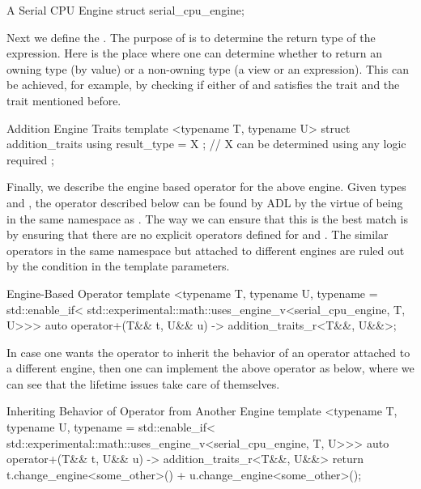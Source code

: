 \documentclass[oneside,11pt,a4paper]{jbarticle}
\begin{document}
\begin{codecpp}{A Serial CPU Engine}
  struct serial_cpu_engine{};
\end{codecpp}

Next we define the . The purpose of
 is to determine the return type of the expression.
Here is the place where one can determine whether to return an owning type (by
value) or a non-owning type (a view or an expression). This can be achieved, for
example, by checking if either of  and  satisfies
the  trait and the
 trait mentioned before.

\begin{codecpp}{Addition Engine Traits}
template <typename T, typename U>
struct addition_traits {
  using result_type = X ; // X can be determined using any logic required
};
\end{codecpp}

Finally, we describe the engine based operator for the above engine. Given types
 and , the operator described below can be found by
ADL by the virtue of being in the same namespace as
. The way we can ensure that this is the best
match is by ensuring that there are no explicit operators defined for
 and . The similar operators in the same  namespace
but attached to different engines are ruled out by the condition in the template
parameters.

\begin{codecpp}{Engine-Based Operator}
template <typename T,
          typename U,
          typename = std::enable_if<
            std::experimental::math::uses_engine_v<serial_cpu_engine, T, U>>>
auto operator+(T&& t, U&& u) -> addition_traits_r<T&&, U&&>;
\end{codecpp}

In case one wants the operator to inherit the behavior of an operator attached
to a different engine, then one can implement the above operator as below, where
we can see that the lifetime issues take care of themselves.

\begin{codecpp}{Inheriting Behavior of Operator from Another Engine}
template <typename T,
          typename U,
          typename = std::enable_if<
            std::experimental::math::uses_engine_v<serial_cpu_engine, T, U>>>
auto operator+(T&& t, U&& u) -> addition_traits_r<T&&, U&&>
{
  return t.change_engine<some_other>() + u.change_engine<some_other>();
}
\end{codecpp}
\end{document}
